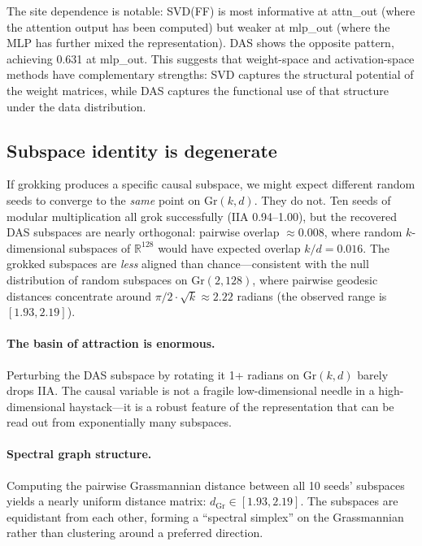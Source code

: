 \documentclass{article}
\newcommand{\Gr}{\mathrm{Gr}}
\newcommand{\IIA}{\mathrm{IIA}}
\newcommand{\R}{\mathbb{R}}
\begin{document}
The site dependence is notable: SVD(FF) is most informative at attn\_out
(where the attention output has been computed) but weaker at mlp\_out
(where the MLP has further mixed the representation). DAS shows the
opposite pattern, achieving 0.631 at mlp\_out. This suggests that
weight-space and activation-space methods have complementary strengths:
SVD captures the structural potential of the weight matrices, while DAS
captures the functional use of that structure under the data distribution.

\subsection{Subspace identity is degenerate}
\label{sec:gauge_freedom}

If grokking produces a specific causal subspace, we might expect different
random seeds to converge to the \emph{same} point on $\Gr(k,d)$. They do
not. Ten seeds of modular multiplication all grok successfully ($\IIA$
0.94--1.00), but the recovered DAS subspaces are nearly orthogonal: pairwise
overlap $\approx 0.008$, where random $k$-dimensional subspaces of
$\R^{128}$ would have expected overlap $k/d = 0.016$. The grokked subspaces
are \emph{less} aligned than chance---consistent with the null distribution
of random subspaces on $\Gr(2, 128)$, where pairwise geodesic distances
concentrate around $\pi/2 \cdot \sqrt{k} \approx 2.22$ radians (the
observed range is $[1.93, 2.19]$).

\paragraph{The basin of attraction is enormous.}
Perturbing the DAS subspace by rotating it 1+ radians on $\Gr(k,d)$
barely drops IIA. The causal variable is not a fragile low-dimensional
needle in a high-dimensional haystack---it is a robust feature of the
representation that can be read out from exponentially many subspaces.

\paragraph{Spectral graph structure.}
Computing the pairwise Grassmannian distance between all 10 seeds'
subspaces yields a nearly uniform distance matrix:
$d_{\Gr} \in [1.93, 2.19]$. The subspaces are equidistant from each other,
forming a ``spectral simplex'' on the Grassmannian rather than clustering
around a preferred direction.
\end{document}
